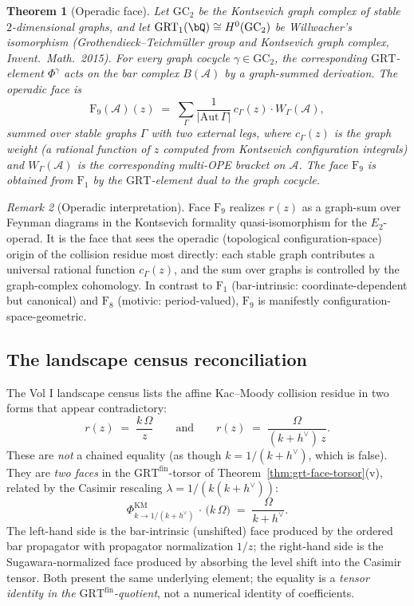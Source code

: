 \documentclass[11pt]{article}
\theoremstyle{plain}
\newtheorem{theorem}{Theorem}[section]
\theoremstyle{definition}
\theoremstyle{remark}
\newtheorem{remark}[theorem]{Remark}
\newcommand{\cA}{\mathcal{A}}
\begin{document}
\begin{theorem}[Operadic face]\label{thm:operadic-face}
Let $\mathrm{GC}_2$ be the Kontsevich graph complex of stable
$2$-dimensional graphs, and let
$\mathrm{GRT}_1(\bQ)\cong H^0(\mathrm{GC}_2)$ be Willwacher's
isomorphism (\emph{Grothendieck--Teichmüller group and
Kontsevich graph complex}, Invent.\ Math.\ 2015). For every graph
cocycle $\gamma\in\mathrm{GC}_2$, the corresponding
$\mathrm{GRT}$-element $\Phi^\gamma$ acts on the bar complex
$B(\cA)$ by a graph-summed derivation. The \emph{operadic face} is
\[
 \mathrm{F}_9(\cA)(z)
 \;=\;
 \sum_{\Gamma}\frac{1}{|\mathrm{Aut}\,\Gamma|}\,
 c_\Gamma(z)\cdot W_\Gamma(\cA),
\]
summed over stable graphs $\Gamma$ with two external legs, where
$c_\Gamma(z)$ is the graph weight (a rational function of $z$
computed from Kontsevich configuration integrals) and
$W_\Gamma(\cA)$ is the corresponding multi-OPE bracket on $\cA$.
The face $\mathrm{F}_9$ is obtained from $\mathrm{F}_1$ by the
$\mathrm{GRT}$-element dual to the graph cocycle.
\end{theorem}

\begin{remark}[Operadic interpretation]
Face $\mathrm{F}_9$ realizes $r(z)$ as a graph-sum over Feynman
diagrams in the Kontsevich formality quasi-isomorphism for the
$E_2$-operad. It is the face that sees the operadic (topological
configuration-space) origin of the collision residue most directly:
each stable graph contributes a universal rational function
$c_\Gamma(z)$, and the sum over graphs is controlled by the
graph-complex cohomology. In contrast to $\mathrm{F}_1$
(bar-intrinsic: coordinate-dependent but canonical) and
$\mathrm{F}_8$ (motivic: period-valued), $\mathrm{F}_9$ is
manifestly configuration-space-geometric.
\end{remark}

\subsection{The landscape census reconciliation}
\label{sec:grt-landscape-fm99}

The Vol I landscape census lists the affine Kac--Moody collision
residue in two forms that appear contradictory:
\[
 r(z) \;=\; \frac{k\,\Omega}{z}
 \qquad\text{and}\qquad
 r(z) \;=\; \frac{\Omega}{(k+h^\vee)\,z}.
\]
These are \emph{not} a chained equality (as though
$k = 1/(k+h^\vee)$, which is false). They are \emph{two faces} in
the $\mathrm{GRT}^{\mathrm{fin}}$-torsor of
Theorem~\ref{thm:grt-face-torsor}(v), related by the Casimir
rescaling $\lambda = 1/(k(k+h^\vee))$:
\begin{equation}\label{eq:casimir-rescaling}
 \Phi^{\mathrm{KM}}_{k\to 1/(k+h^\vee)}\,\cdot\,
 \bigl(k\,\Omega\bigr)
 \;=\;
 \frac{\Omega}{k+h^\vee}.
\end{equation}
The left-hand side is the bar-intrinsic (unshifted) face produced
by the ordered bar propagator with propagator normalization
$1/z$; the right-hand side is the Sugawara-normalized face produced
by absorbing the level shift into the Casimir tensor. Both
present the same underlying element; the equality is a
\emph{tensor identity in the $\mathrm{GRT}^{\mathrm{fin}}$-quotient},
not a numerical identity of coefficients.
\end{document}
